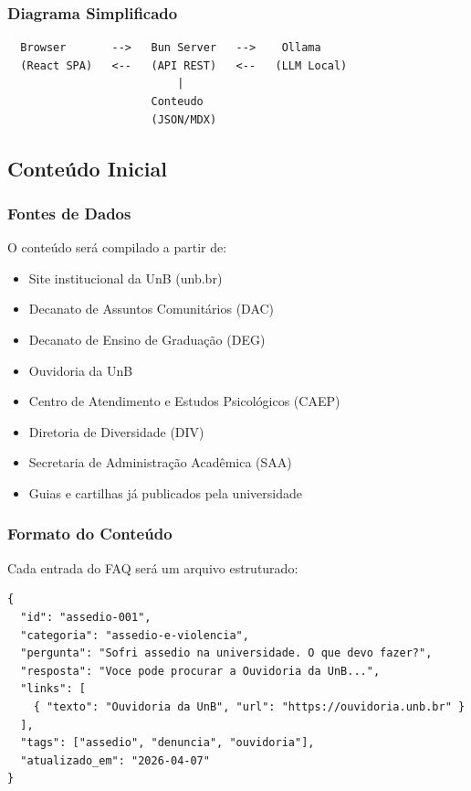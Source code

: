 \documentclass[12pt, a4paper]{article}
\begin{document}
\subsubsection{Diagrama Simplificado}

\begin{lstlisting}
  Browser       -->   Bun Server   -->    Ollama
  (React SPA)   <--   (API REST)   <--   (LLM Local)
                          |
                      Conteudo
                      (JSON/MDX)
\end{lstlisting}

\subsection{Conteúdo Inicial}

\subsubsection{Fontes de Dados}

O conteúdo será compilado a partir de:

\begin{itemize}
  \item Site institucional da UnB (unb.br)
  \item Decanato de Assuntos Comunitários (DAC)
  \item Decanato de Ensino de Graduação (DEG)
  \item Ouvidoria da UnB
  \item Centro de Atendimento e Estudos Psicológicos (CAEP)
  \item Diretoria de Diversidade (DIV)
  \item Secretaria de Administração Acadêmica (SAA)
  \item Guias e cartilhas já publicados pela universidade
\end{itemize}

\subsubsection{Formato do Conteúdo}

Cada entrada do FAQ será um arquivo estruturado:

\begin{lstlisting}
{
  "id": "assedio-001",
  "categoria": "assedio-e-violencia",
  "pergunta": "Sofri assedio na universidade. O que devo fazer?",
  "resposta": "Voce pode procurar a Ouvidoria da UnB...",
  "links": [
    { "texto": "Ouvidoria da UnB", "url": "https://ouvidoria.unb.br" }
  ],
  "tags": ["assedio", "denuncia", "ouvidoria"],
  "atualizado_em": "2026-04-07"
}
\end{lstlisting}
\end{document}
